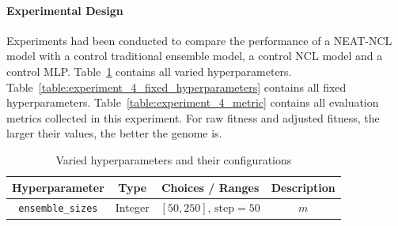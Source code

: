 \paragraph{Experimental Design}
Experiments had been conducted to compare the performance of a NEAT-NCL model with a control traditional ensemble model, a control NCL model and a control MLP. Table~\ref{table:experiment_4_varied_hyperparameters} contains all varied hyperparameters. Table~\ref{table:experiment_4_fixed_hyperparameters} contains all fixed hyperparameters. Table~\ref{table:experiment_4_metric} contains all evaluation metrics collected in this experiment. For raw fitness and adjusted fitness, the larger their values, the better the genome is. 

\begin{table}[H]
    \centering
    \begin{tabular}{|c|c|c|c|}
        \hline
        Hyperparameter & Type & Choices / Ranges & Description \\
        \hline
        \small\texttt{ensemble\_sizes} & Integer & $[50, 250]\text{, step}=50$ & $m$ \\
        \hline
    \end{tabular}
    \caption{Varied hyperparameters and their configurations}
    \label{table:experiment_4_varied_hyperparameters}
\end{table}

